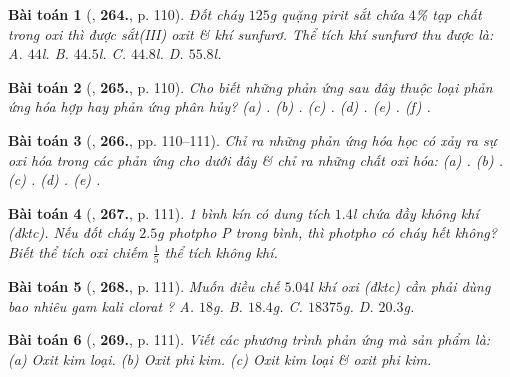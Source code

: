 \documentclass{article}
\numberwithin{equation}{section}
\newtheorem{baitoan}{Bài toán}
\begin{document}
\begin{baitoan}[\cite{An_400_BT_Hoa_Hoc_8_2020}, \textbf{264.}, p. 110]
	Đốt cháy $125$\emph{g} quặng pirit sắt chứa $4$\% tạp chất trong oxi thì được sắt(III) oxit \& khí sunfurơ. Thể tích khí sunfurơ thu được là: {\sf A.} $44$\emph{l}. {\sf B.} $44.5$\emph{l}. {\sf C.} $44.8$\emph{l}. {\sf D.} $55.8$\emph{l}.
\end{baitoan}

\begin{baitoan}[\cite{An_400_BT_Hoa_Hoc_8_2020}, \textbf{265.}, p. 110]
	Cho biết những phản ứng sau đây thuộc loại phản ứng hóa hợp hay phản ứng phân hủy? (a) \emph{}. (b) \emph{}. (c) \emph{}. (d) \emph{}. (e) \emph{}. (f) \emph{}.
\end{baitoan}

\begin{baitoan}[\cite{An_400_BT_Hoa_Hoc_8_2020}, \textbf{266.}, pp. 110--111]
	Chỉ ra những phản ứng hóa học có xảy ra sự oxi hóa trong các phản ứng cho dưới đây \& chỉ ra những chất oxi hóa: (a) \emph{}. (b) \emph{}. (c) \emph{}. (d) \emph{}. (e) \emph{}.
\end{baitoan}

\begin{baitoan}[\cite{An_400_BT_Hoa_Hoc_8_2020}, \textbf{267.}, p. 111]
	1 bình kín có dung tích $1.4$\emph{l} chứa đầy không khí (đktc). Nếu đốt cháy $2.5$\emph{g} photpho \emph{P} trong bình, thì photpho có cháy hết không? Biết thể tích oxi chiếm $\frac{1}{5}$ thể tích không khí.
\end{baitoan}

\begin{baitoan}[\cite{An_400_BT_Hoa_Hoc_8_2020}, \textbf{268.}, p. 111]
	Muốn điều chế $5.04$\emph{l} khí oxi (đktc) cần phải dùng bao nhiêu gam kali clorat \emph{}? {\sf A.} $18$\emph{g}. {\sf B.} $18.4$\emph{g}. {\sf C.} $18375$\emph{g}. {\sf D.} $20.3$\emph{g}.
\end{baitoan}

\begin{baitoan}[\cite{An_400_BT_Hoa_Hoc_8_2020}, \textbf{269.}, p. 111]
	Viết các phương trình phản ứng mà sản phẩm là: (a) Oxit kim loại. (b) Oxit phi kim. (c) Oxit kim loại \& oxit phi kim.
\end{baitoan}
\end{document}

